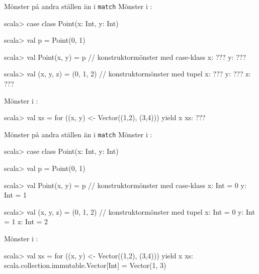 \begin{Slide}{Mönster på andra ställen än i \texttt{match}}\SlideFontSmall
Mönster i :
\vspace{-0.25em}\begin{REPL}
scala> case class Point(x: Int, y: Int)

scala> val p = Point(0, 1)

scala> val Point(x, y) = p          // konstruktormönster med case-klass
x: ???
y: ???

scala> val (x, y, z) = (0, 1, 2)    // konstruktormönster med tupel
x: ???
y: ???
z: ???

\end{REPL}
Mönster i :
\vspace{-0.25em}\begin{REPL}
scala> val xs = for ((x, y) <- Vector((1,2), (3,4))) yield x
xs: ???
\end{REPL}

\end{Slide}

\begin{Slide}{Mönster på andra ställen än i \texttt{match}}\SlideFontSmall
Mönster i :
\vspace{-0.25em}\begin{REPL}
scala> case class Point(x: Int, y: Int)

scala> val p = Point(0, 1)

scala> val Point(x, y) = p          // konstruktormönster med case-klass
x: Int = 0
y: Int = 1

scala> val (x, y, z) = (0, 1, 2)    // konstruktormönster med tupel
x: Int = 0
y: Int = 1
z: Int = 2

\end{REPL}
Mönster i :
\vspace{-0.25em}\begin{REPL}
scala> val xs = for ((x, y) <- Vector((1,2), (3,4))) yield x
xs: scala.collection.immutable.Vector[Int] = Vector(1, 3)
\end{REPL}
\end{Slide}

